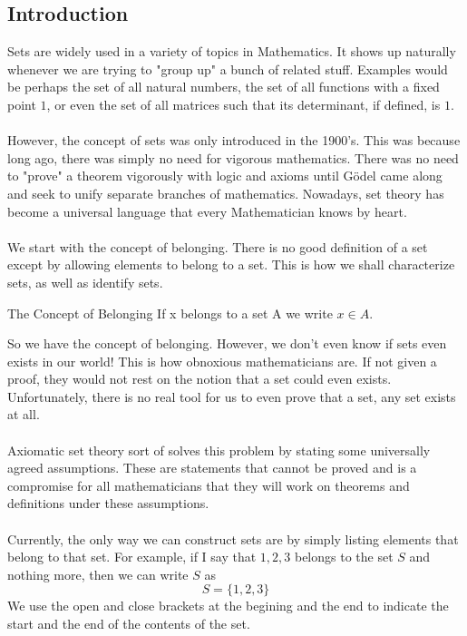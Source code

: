 \documentclass[a4paper]{article}
\begin{document}
\subsection{Introduction}
Sets are widely used in a variety of topics in Mathematics. It shows up naturally whenever we are trying to "group up" a bunch of related stuff. Examples would be perhaps the set of all natural numbers, the set of all functions with a fixed point $1$, or even the set of all matrices such that its determinant, if defined, is $1$. \\~\\
However, the concept of sets was only introduced in the 1900's. This was because long ago, there was simply no need for vigorous mathematics. There was no need to "prove" a theorem vigorously with logic and axioms until Gödel came along and seek to unify separate branches of mathematics. Nowadays, set theory has become a universal language that every Mathematician knows by heart. \\~\\
We start with the concept of belonging. There is no good definition of a set except by allowing elements to belong to a set. This is how we shall characterize sets, as well as identify sets. 
\begin{defn}{The Concept of Belonging}{} If x belongs to a set A we write $x\in A$. 
\end{defn}

So we have the concept of belonging. However, we don't even know if sets even exists in our world! This is how obnoxious mathematicians are. If not given a proof, they would not rest on the notion that a set could even exists. Unfortunately, there is no real tool for us to even prove that a set, any set exists at all. \\~\\
Axiomatic set theory sort of solves this problem by stating some universally agreed assumptions. These are statements that cannot be proved and is a compromise for all mathematicians that they will work on theorems and definitions under these assumptions. \\~\\

Currently, the only way we can construct sets are by simply listing elements that belong to that set. For example, if I say that $1,2,3$ belongs to the set $S$ and nothing more, then we can write $S$ as $$S=\{1,2,3\}$$ We use the open and close brackets at the begining and the end to indicate the start and the end of the contents of the set. 
\end{document}
